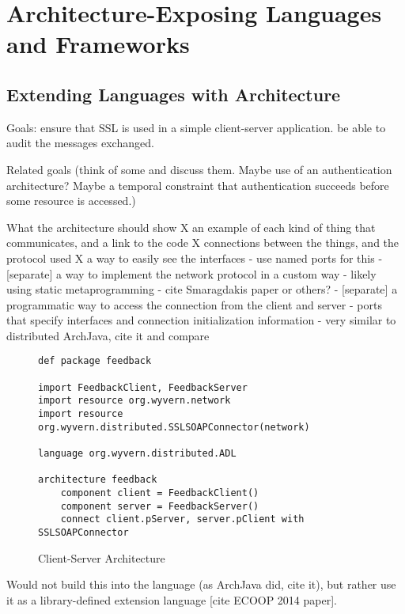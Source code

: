 \documentclass[runningheads]{llncs}
\begin{document}
\begin{sloppypar}
\section{Architecture-Exposing Languages and Frameworks}

\subsection{Extending Languages with Architecture}

Goals: ensure that SSL is used in a simple client-server application.  be able to audit the messages exchanged.

Related goals (think of some and discuss them.  Maybe use of an authentication architecture?  Maybe a temporal constraint that authentication succeeds before some resource is accessed.)

What the architecture should show
 X an example of each kind of thing that communicates, and a link to the code
 X connections between the things, and the protocol used
 X a way to easily see the interfaces
   - use named ports for this
 - [separate] a way to implement the network protocol in a custom way
   - likely using static metaprogramming
   - cite Smaragdakis paper or others?
 - [separate] a programmatic way to access the connection from the client and server
   - ports that specify interfaces and connection initialization information
   - very similar to distributed ArchJava, cite it and compare

\clearpage
   
\begin{figure}[t]
\begin{lstlisting}
def package feedback

import FeedbackClient, FeedbackServer
import resource org.wyvern.network
import resource org.wyvern.distributed.SSLSOAPConnector(network)

language org.wyvern.distributed.ADL

architecture feedback
    component client = FeedbackClient()
    component server = FeedbackServer()
    connect client.pServer, server.pClient with SSLSOAPConnector
\end{lstlisting}
\caption{Client-Server Architecture}
\label{f-architecture}
\end{figure}

Would not build this into the language (as ArchJava did, cite it), but rather use it as a library-defined extension language [cite ECOOP 2014 paper].


\end{sloppypar}
\end{document}
